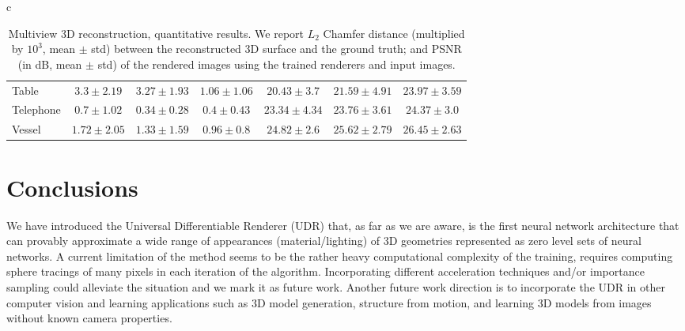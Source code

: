 \documentclass[runningheads]{llncs}
\begin{document}
\begin{table}[t]
\begin{tabular}{c}
\begin{adjustbox}{max width=\textwidth}
\begin{tabular}[t]{l||ccc|ccc}
        Table & $3.3\pm2.19$ & $3.27\pm1.93$ & $\mathbf{1.06}\pm1.06$ & 
        $20.43\pm3.7$ & $21.59\pm4.91$ & $\mathbf{23.97}\pm3.59$ \\
        Telephone & $0.7\pm1.02$ & $\mathbf{0.34}\pm0.28$ & $0.4\pm0.43$ &
        $23.34\pm4.34$ & $23.76\pm3.61$ & $\mathbf{24.37}\pm3.0$ \\
        Vessel & $1.72\pm2.05$ & $1.33\pm1.59$ & $\mathbf{0.96}\pm0.8$ &
        $24.82\pm2.6$ & $25.62\pm2.79$ & $\mathbf{26.45}\pm2.63$ \\
        \bottomrule
              \end{tabular} 
        \end{adjustbox}
      
    \end{tabular}
    \vspace{3pt}
    \caption{Multiview 3D reconstruction, quantitative results. We report $L_2$ Chamfer distance (multiplied by $10^3$, mean $\pm$ std) between the reconstructed 3D surface and the ground truth; and PSNR (in dB, mean $\pm$ std) of the rendered images using the trained renderers and input images. } %
    \label{tab:multiview_reconstruction}
\end{table}
  
  
 \section{Conclusions}
 We have introduced the Universal Differentiable Renderer (UDR) that, as far as we are aware, is the first neural network architecture that can provably approximate a wide range of appearances (material/lighting) of 3D geometries represented as zero level sets of neural networks. 
 A current limitation of the method seems to be the rather heavy computational complexity of the training, requires computing sphere tracings of many pixels in each iteration of the algorithm. Incorporating different acceleration techniques and/or importance sampling could alleviate the situation and we mark it as future work. 
 Another future work direction is to incorporate the UDR in other computer vision and learning applications such as 3D model generation, structure from motion, and learning 3D models from images without known camera properties. 
 
 
 
\end{document}

